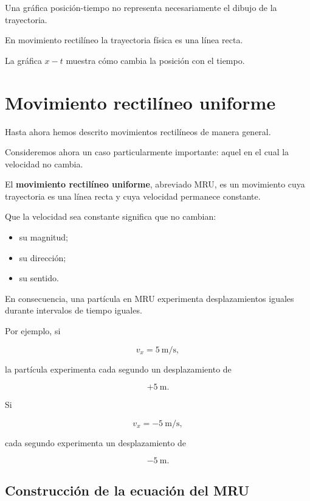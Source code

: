 \begin{advertencia}
Una gráfica posición-tiempo no representa necesariamente el dibujo de la
trayectoria.

En movimiento rectilíneo la trayectoria física es una línea recta.

La gráfica \(x-t\) muestra cómo cambia la posición con el tiempo.
\end{advertencia}


\section{Movimiento rectilíneo uniforme}

Hasta ahora hemos descrito movimientos rectilíneos de manera general.

Consideremos ahora un caso particularmente importante: aquel en el cual la
velocidad no cambia.

\begin{definicion}
El \textbf{movimiento rectilíneo uniforme}, abreviado MRU, es un movimiento
cuya trayectoria es una línea recta y cuya velocidad permanece constante.
\end{definicion}

Que la velocidad sea constante significa que no cambian:

\begin{itemize}
    \item su magnitud;
    \item su dirección;
    \item su sentido.
\end{itemize}

En consecuencia, una partícula en MRU experimenta desplazamientos iguales
durante intervalos de tiempo iguales.

Por ejemplo, si

\[ v_x=\SI{5}{\meter\per\second}, \]

la partícula experimenta cada segundo un desplazamiento de

\[ +\SI{5}{\meter}. \]

Si

\[ v_x=-\SI{5}{\meter\per\second}, \]

cada segundo experimenta un desplazamiento de

\[ -\SI{5}{\meter}. \]


\subsection{Construcción de la ecuación del MRU}

